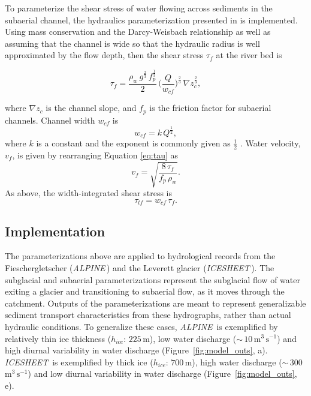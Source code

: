 \documentclass[11pt]{article}
\newcommand{\mauro}[1]{{\textbf{\color{green}Mauro says:} \color{green} #1} }
\newcommand{\alpine}{\textit{ALPINE}\,}
\newcommand{\icesheet}{\textit{ICESHEET}\,}
\newcommand{\unit}[1]{$\mathrm{#1}$}
\begin{document}
To parameterize the shear stress of water flowing across sediments in the subaerial channel,  the hydraulics parameterization presented in \citet{tucker1997} is implemented.
Using mass conservation and the Darcy-Weisbach relationship as well as assuming that the channel is wide so that the hydraulic radius is well approximated by the flow depth, then
the shear stress $\tau_f$ at the river bed is
\begin{linenomath*}
  \begin{equation}
    \label{eq:DW_tau}
    \tau_f=\frac{\rho_w\,g^{\frac{2}{3}}\,f_p^{\frac{1}{3}}}{2}\, \Big(\frac{Q}{w_{cf}} \Big)^{\frac{2}{3}} \,\nabla z_c^{\frac{2}{3}},
  \end{equation}
\end{linenomath*}
where $\nabla z_c$ is the channel slope, and $f_p$ is the friction factor for subaerial channels.
Channel width $w_{cf}$ is
\begin{equation}
  \label{eq:wcf}
  w_{cf} = k \, Q^\frac{1}{2},
\end{equation}
%
where $k$ is a constant and the exponent is commonly given as $\frac{1}{2}$ \citep{leopold1953}.
Water velocity, $v_f$, is given by rearranging Equation \ref{eq:tau} as
\begin{equation}
  \label{eq:vf}
  v_f = \sqrt{\frac{8\,\tau_f}{f_p\,\rho_w}}.
\end{equation}
%
As above, the width-integrated shear stress is
\begin{equation}
    \label{eq:tautf}
    \tau_{tf}=w_{cf}\,\tau_f.
\end{equation}
\subsection{Implementation}
\label{sect:imp}

The parameterizations above are applied to hydrological records from the Fieschergletscher (\alpine) and the Leverett glacier (\icesheet).
The subglacial and subaerial parameterizations represent the subglacial flow of water exiting a glacier and transitioning to subaerial flow, as it moves through the catchment.
Outputs of the parameterizations are meant to represent generalizable sediment transport characteristics from these hydrographs, rather than actual hydraulic conditions.
To generalize these cases, \alpine{}  is exemplified by relatively thin ice thickness ($h_{ice}$: $225$\,\unit{m}), low water discharge ($\sim\,10$\,\unit{m}$^3$\,\unit{s}$^{-1}$) and high diurnal variability in water discharge (Figure~\ref{fig:model_outs}, a).
\icesheet{}  is exemplified by thick ice  ($h_{ice}$: $700$\,\unit{m}), high water discharge ($\sim\,300$\,\unit{m}$^3$\,\unit{s}$^{-1}$)  and low diurnal variability in water discharge (Figure~\ref{fig:model_outs}, e).
\end{document}
